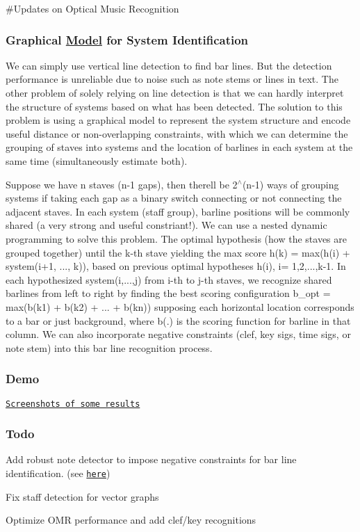 \#\+Updates on Optical Music Recognition

\subsubsection*{Graphical \hyperlink{class_model}{Model} for System Identification}


\begin{DoxyEnumerate}
\item We can simply use vertical line detection to find bar lines. But the detection performance is unreliable due to noise such as note stems or lines in text. The other problem of solely relying on line detection is that we can hardly interpret the structure of systems based on what has been detected. The solution to this problem is using a graphical model to represent the system structure and encode useful distance or non-\/overlapping constraints, with which we can determine the grouping of staves into systems and the location of barlines in each system at the same time (simultaneously estimate both).
\item Suppose we have n staves (n-\/1 gaps), then there\textquotesingle{}ll be 2$^\wedge$(n-\/1) ways of grouping systems if taking each gap as a binary switch connecting or not connecting the adjacent staves. In each system (staff group), barline positions will be commonly shared (a very strong and useful constriant!). We can use a nested dynamic programming to solve this problem. The optimal hypothesis (how the staves are grouped together) until the k-\/th stave yielding the max score h(k) = max(h(i) + system(i+1, ..., k)), based on previous optimal hypotheses h(i), i= 1,2,...,k-\/1. In each hypothesized system(i,...,j) from i-\/th to j-\/th staves, we recognize shared barlines from left to right by finding the best scoring configuration b\+\_\+opt = max(b(k1) + b(k2) + ... + b(kn)) supposing each horizontal location corresponds to a bar or just background, where b(.) is the scoring function for barline in that column. We can also incorporate negative constraints (clef, key sigs, time sigs, or note stem) into this bar line recognition process.
\end{DoxyEnumerate}

\subsubsection*{Demo}

\href{https://musescore.org/en/node/110306#comment-500796}{\tt Screenshots of some results}

\subsubsection*{Todo}


\begin{DoxyItemize}
\item Add robust note detector to impose negative constraints for bar line identification. (see \href{https://github.com/musescore/MuseScore/blob/master/omr/omrpage.cpp#L292}{\tt here})
\item Fix staff detection for vector graphs
\item Optimize O\+MR performance and add clef/key recognitions 
\end{DoxyItemize}